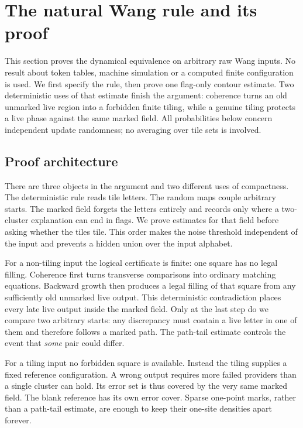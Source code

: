 \section{The natural Wang rule and its proof}\label{sec:natural}

This section proves the dynamical equivalence on arbitrary raw Wang inputs. No result about token tables, machine simulation or a computed finite configuration is used. We first specify the rule, then prove one flag-only contour estimate. Two deterministic uses of that estimate finish the argument: coherence turns an old unmarked live region into a forbidden finite tiling, while a genuine tiling protects a live phase against the same marked field. All probabilities below concern independent update randomness; no averaging over tile sets is involved.

\subsection{Proof architecture}

There are three objects in the argument and two different uses of compactness. The deterministic rule reads tile letters. The random maps couple arbitrary starts. The marked field forgets the letters entirely and records only where a two-cluster explanation can end in flags. We prove estimates for that field before asking whether the tiles tile. This order makes the noise threshold independent of the input and prevents a hidden union over the input alphabet.

For a non-tiling input the logical certificate is finite: one square has no legal filling. Coherence first turns transverse comparisons into ordinary matching equations. Backward growth then produces a legal filling of that square from any sufficiently old unmarked live output. This deterministic contradiction places every late live output inside the marked field. Only at the last step do we compare two arbitrary starts: any discrepancy must contain a live letter in one of them and therefore follows a marked path. The path-tail estimate controls the event that \emph{some} pair could differ.

For a tiling input no forbidden square is available. Instead the tiling supplies a fixed reference configuration. A wrong output requires more failed providers than a single cluster can hold. Its error set is thus covered by the very same marked field. The blank reference has its own error cover. Sparse one-point marks, rather than a path-tail estimate, are enough to keep their one-site densities apart forever.

